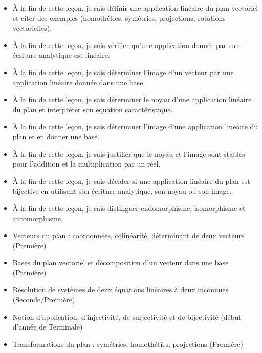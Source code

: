\documentclass[11pt]{article}
\begin{document}
\begin{objectifs}
\begin{itemize}
\item À la fin de cette leçon, je sais définir une application linéaire du plan vectoriel et citer des exemples (homothéties, symétries, projections, rotations vectorielles).
\item À la fin de cette leçon, je sais vérifier qu'une application donnée par son écriture analytique est linéaire.
\item À la fin de cette leçon, je sais déterminer l'image d'un vecteur par une application linéaire donnée dans une base.
\item À la fin de cette leçon, je sais déterminer le noyau d'une application linéaire du plan et interpréter son équation caractéristique.
\item À la fin de cette leçon, je sais déterminer l'image d'une application linéaire du plan et en donner une base.
\item À la fin de cette leçon, je sais justifier que le noyau et l'image sont stables pour l'addition et la multiplication par un réel.
\item À la fin de cette leçon, je sais décider si une application linéaire du plan est bijective en utilisant son écriture analytique, son noyau ou son image.
\item À la fin de cette leçon, je sais distinguer endomorphisme, isomorphisme et automorphisme.
\end{itemize}
\end{objectifs}

\begin{prerequis}
\begin{itemize}
\item Vecteurs du plan : coordonnées, colinéarité, déterminant de deux vecteurs (Première)
\item Bases du plan vectoriel et décomposition d'un vecteur dans une base (Première)
\item Résolution de systèmes de deux équations linéaires à deux inconnues (Seconde/Première)
\item Notion d'application, d'injectivité, de surjectivité et de bijectivité (début d'année de Terminale)
\item Transformations du plan : symétries, homothéties, projections (Première)
\end{itemize}
\end{prerequis}

\newpage
\end{document}
